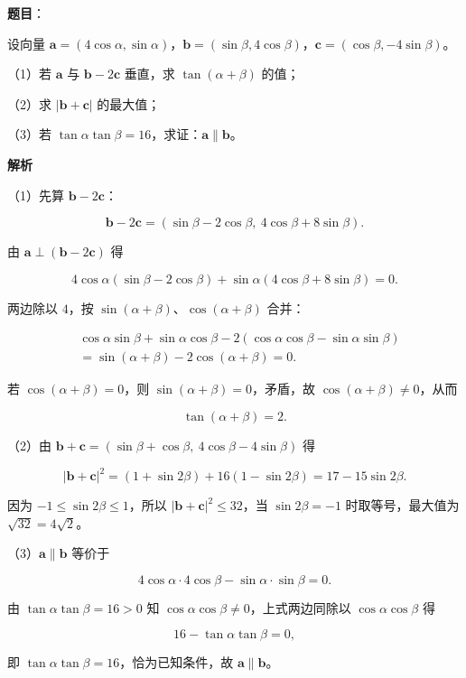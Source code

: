 \begin{answer}

\textbf{题目}：

设向量 $\boldsymbol a=(4\cos\alpha,\sin\alpha)$，$\boldsymbol b=(\sin\beta,4\cos\beta)$，$\boldsymbol c=(\cos\beta,-4\sin\beta)$。

（1）若 $\boldsymbol a$ 与 $\boldsymbol b-2\boldsymbol c$ 垂直，求 $\tan(\alpha+\beta)$ 的值；

（2）求 $|\boldsymbol b+\boldsymbol c|$ 的最大值；

（3）若 $\tan\alpha\tan\beta=16$，求证：$\boldsymbol a\parallel\boldsymbol b$。

\textbf{解析}

（1）先算 $\boldsymbol b-2\boldsymbol c$：

\nopagebreak[4]
\[\boldsymbol b-2\boldsymbol c=(\sin\beta-2\cos\beta,\ 4\cos\beta+8\sin\beta).\]

由 $\boldsymbol a\perp(\boldsymbol b-2\boldsymbol c)$ 得

\nopagebreak[4]
\[4\cos\alpha(\sin\beta-2\cos\beta)+\sin\alpha(4\cos\beta+8\sin\beta)=0 .\]

两边除以 $4$，按 $\sin(\alpha+\beta)$、$\cos(\alpha+\beta)$ 合并：

\nopagebreak[4]
\[\begin{aligned}
&\cos\alpha\sin\beta+\sin\alpha\cos\beta-2(\cos\alpha\cos\beta-\sin\alpha\sin\beta)\\
&=\sin(\alpha+\beta)-2\cos(\alpha+\beta)=0 .
\end{aligned}\]

若 $\cos(\alpha+\beta)=0$，则 $\sin(\alpha+\beta)=0$，矛盾，故 $\cos(\alpha+\beta)\neq0$，从而

\nopagebreak[4]
\[\tan(\alpha+\beta)=2 .\]

（2）由 $\boldsymbol b+\boldsymbol c=(\sin\beta+\cos\beta,\ 4\cos\beta-4\sin\beta)$ 得

\nopagebreak[4]
\[|\boldsymbol b+\boldsymbol c|^2=(1+\sin2\beta)+16(1-\sin2\beta)=17-15\sin2\beta .\]

因为 $-1\leqslant\sin2\beta\leqslant1$，所以 $|\boldsymbol b+\boldsymbol c|^2\leqslant32$，当 $\sin2\beta=-1$ 时取等号，最大值为 $\sqrt{32}=4\sqrt2$。

（3）$\boldsymbol a\parallel\boldsymbol b$ 等价于

\nopagebreak[4]
\[4\cos\alpha\cdot4\cos\beta-\sin\alpha\cdot\sin\beta=0 .\]

由 $\tan\alpha\tan\beta=16>0$ 知 $\cos\alpha\cos\beta\neq0$，上式两边同除以 $\cos\alpha\cos\beta$ 得

\nopagebreak[4]
\[16-\tan\alpha\tan\beta=0,\]

即 $\tan\alpha\tan\beta=16$，恰为已知条件，故 $\boldsymbol a\parallel\boldsymbol b$。


\end{answer}
